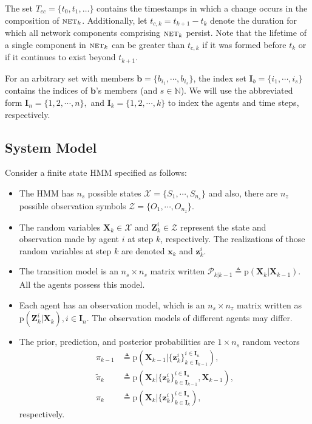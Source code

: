 \documentclass[journal]{IEEEtran}
\newcommand{\vect}[1]{{\mathbf{#1}}}
\newcommand{\net}{\ensuremath{\textsc{net}}}
\theoremstyle{remark}
\newcommand{\pr}{\textrm{p}}
\newcommand{\XX}[3][2]{\mathbf{X}_{  #2}^{ #3}}
\newcommand{\bIn}{\boldsymbol{I}_{{n}}}
\newcommand{\bIk}{\boldsymbol{I}_{{k}}}
\newcommand{\bIkk}{\boldsymbol{I}_{{k-1}}}
\newcommand{\zz}[3][2]{\mathbf{z}_{ #2}^{ #3}}
\theoremstyle{definition}
\begin{document}
The set $T_{cc}=\{t_0, t_1, \dots \}$ contains the timestamps in which a change occurs in the composition of $\net_k$. Additionally, let $t_{c,k} = t_{k+1} - t_{k}$ denote the duration for which all network components comprising $\net_k$ persist. Note that the lifetime of a single component in $\net_k$ can be greater than $t_{c,k}$ if it was formed before $t_{k}$ or if it continues to exist beyond $t_{k+1}$.


For an arbitrary set 
with 
members $\mathbf{b}=\{b_{i_1},\cdots,b_{i_s}\}$, 
the index set $\boldsymbol{I}_{b}=\{i_1,\cdots,i_{s}\}$ contains the indices of
$\mathbf{b}$'s members (and $s\in \mathbb{N} $). We will use the abbreviated
form  $ \bIn = 
\{1,2,\cdots,n\},$ and $\bIk = \{1,2,\cdots,k\}$ to index the agents and time 
steps, respectively.

\subsection{System Model} 

Consider a finite state HMM specified as follows:

\begin{itemize}
\item The HMM has $n_s$ possible states 
 \mbox{$\mathcal{X} = \{S_1,\cdots,S_{n_s}\}$} and also, there are $n_z$ possible observation symbols 
 \mbox{$\mathcal{Z} = \{O_1,\cdots,O_{n_z}\}$}.
\item The random variables $\vect{X}_k \in \mathcal{X}$ and $\vect{Z}_k^i \in
 \mathcal{Z}$ represent the state and observation made by agent $i$ at step $k$,
 respectively. The realizations of those random variables at step $k$ are
 denoted $\vect{x}_k$ and $\vect{z}_k^i$.    
\item The transition model is an $n_s\times n_s$ matrix written
 $\mathcal{P}_{k \vert k-1}\triangleq \pr(\vect{X}_{k} | \XX[]{k-1}{})$. All the
 agents possess this model.
\item Each agent has an observation model, which is an $n_s\times n_z$ 
 matrix written as $\pr(\vect{Z}_{k}^{i} | \vect{X}_{k}), i\in\bIn$. The 
 observation models of different agents may differ.
\item The prior, prediction, and posterior probabilities are $1\times n_s$ random vectors
 \begin{align}
 \pi_{k-1}&\triangleq \pr\left(\XX[]{k-1}{}|\{\zz{k}{i}\}^{i\in\bIn}_{k\in\bIkk}\right),\nonumber\\
 \tilde{\pi}_{k}&\triangleq \pr\left(\XX[]{k}{}|\{\zz{k}{i}\}^{i\in\bIn}_{k\in\bIkk},\XX[]{k-1}{}\right),\nonumber\\
 \pi_{k}&\triangleq \pr\left(\XX[]{k}{}|\{\zz{k}{i}\}^{i\in\bIn}_{k\in\bIk}\right),\nonumber
 \end{align}
 respectively.
\end{itemize}
\end{document}
